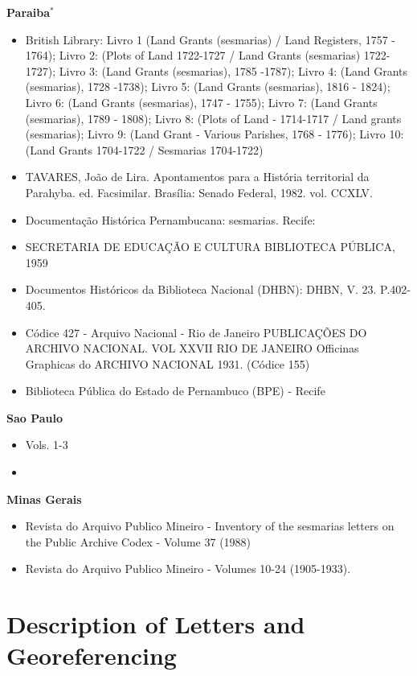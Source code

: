 \documentclass[11pt]{article}
\begin{document}
\textbf{Paraiba$^*$}
\begin{itemize}
  \item British Library: Livro 1 (Land Grants (sesmarias) / Land Registers, 1757 - 1764); Livro 2: (Plots of Land 1722-1727 / Land Grants (sesmarias) 1722-1727); Livro 3: (Land Grants (sesmarias), 1785 -1787); Livro 4: (Land Grants (sesmarias), 1728 -1738); Livro 5: (Land Grants (sesmarias), 1816 - 1824); Livro 6: (Land Grants (sesmarias), 1747 - 1755); Livro 7: (Land Grants (sesmarias), 1789 - 1808); Livro 8: (Plots of Land - 1714-1717 / Land grants (sesmarias); Livro 9: (Land Grant - Various Parishes, 1768 - 1776); Livro 10: (Land Grants 1704-1722 / Sesmarias 1704-1722)
  \item TAVARES, João de Lira. Apontamentos para a História territorial da Parahyba. ed. Facsimilar. Brasília: Senado Federal, 1982. vol. CCXLV.
  \item Documentação Histórica Pernambucana: sesmarias. Recife:
  \item SECRETARIA DE EDUCAÇÃO E CULTURA BIBLIOTECA PÚBLICA, 1959
  \item Documentos Históricos da Biblioteca Nacional (DHBN): DHBN, V. 23. P.402-405.
  \item Códice 427 - Arquivo Nacional - Rio de Janeiro
  PUBLICAÇÕES DO ARCHIVO NACIONAL. VOL XXVII RIO DE
  JANEIRO Officinas Graphicas do ARCHIVO NACIONAL 1931. (Códice 155)
  \item Biblioteca Pública do Estado de Pernambuco (BPE) - Recife
  
\end{itemize}


\textbf{Sao Paulo}
\begin{itemize}
\item \textcite{noauthor_1921-qd} Vols. 1-3 
\item \textcite{Instituto-Historico-e-Geografico-de-Sao-Paulo1928-ej}
\end{itemize}

\textbf{Minas Gerais}
\begin{itemize}
  \item Revista do Arquivo Publico Mineiro - Inventory of the sesmarias letters on the Public Archive Codex - Volume 37 (1988)
  \item Revista do Arquivo Publico Mineiro - Volumes 10-24 (1905-1933). 
\end{itemize}

\clearpage

\section{Description of Letters and Georeferencing}
\label{app:appendix_data}
\end{document}
